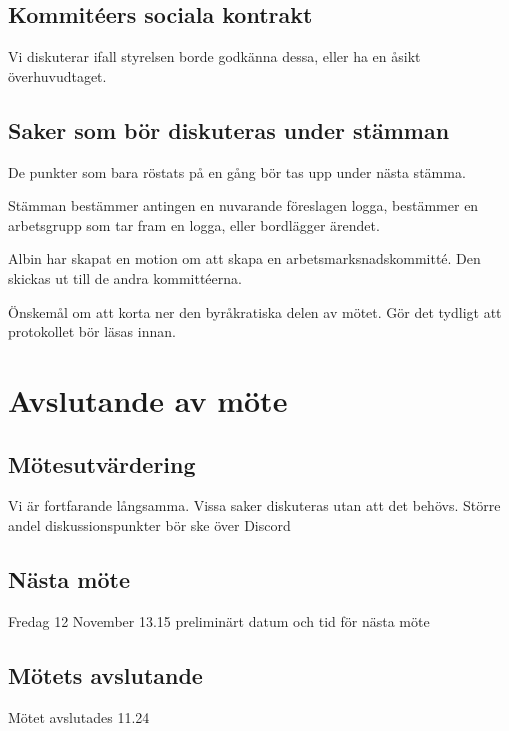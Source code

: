 \documentclass[protokoll]{dvd}
\begin{document}
\subsection{Kommitéers sociala kontrakt}
    Vi diskuterar ifall styrelsen borde godkänna dessa, eller ha en åsikt överhuvudtaget.


\subsection{Saker som bör diskuteras under stämman}
    De punkter som bara röstats på en gång bör tas upp under nästa stämma.

    Stämman bestämmer antingen en nuvarande föreslagen logga, bestämmer en arbetsgrupp som tar fram en logga, eller bordlägger ärendet.

    Albin har skapat en motion om att skapa en arbetsmarksnadskommitté. Den skickas ut till de andra kommittéerna.

    Önskemål om att korta ner den byråkratiska delen av mötet. Gör det tydligt att protokollet bör läsas innan.

\newpage




\section{Avslutande av möte}

\subsection{Mötesutvärdering}
    Vi är fortfarande långsamma. Vissa saker diskuteras utan att det behövs. Större andel diskussionspunkter bör ske över Discord

\subsection{Nästa möte}
   Fredag 12 November 13.15 preliminärt datum och tid för nästa möte 

\subsection{Mötets avslutande}

    Mötet avslutades 11.24

\styrelsesignaturer
\end{document}
